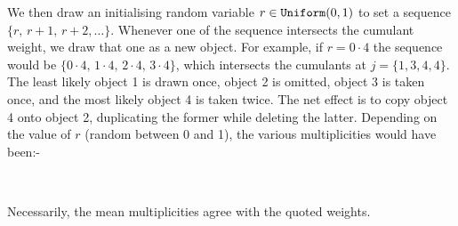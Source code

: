 \smallskip
\noindent We then draw an initialising random variable $r \in \hbox{\tt Uniform}(0,1)$ to set a sequence \hbox{$\{r,\,r+1,\,r+2,\ldots\}$}.  
Whenever one of the sequence intersects the cumulant weight, we draw that one as a new object.
For example, if $r=0{\cdot}4$ the sequence would be $\{0{\cdot}4,\,1{\cdot}4,\,2{\cdot}4,\,3{\cdot}4\}$, which intersects the cumulants at \hbox{$j = \{1,3,4,4\}$}.
The least likely object 1 is drawn once, object 2 is omitted, object 3 is taken once, and the most likely object 4 is taken twice.  
The net effect is to copy object 4 onto object 2, duplicating the former while deleting the latter.
Depending on the value of $r$ (random between 0 and 1), the various multiplicities would have been:-
\smallskip
\centerline{\hbox{
\vbox{\offinterlineskip
      }
\vbox{\offinterlineskip
      }
}}
\smallskip
\noindent
Necessarily, the mean multiplicities agree with the quoted weights.


